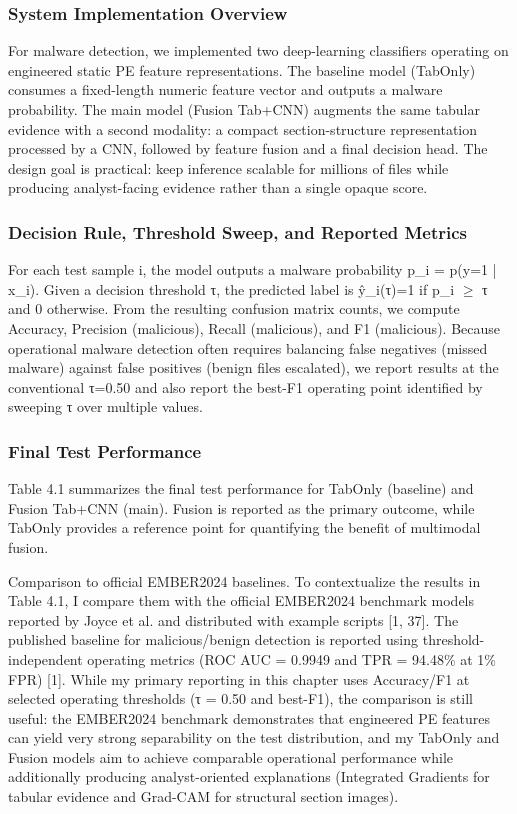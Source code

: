 \documentclass[conference]{IEEEtran}
\begin{document}
\subsubsection{System Implementation Overview}

For malware detection, we implemented two deep-learning classifiers operating on engineered static PE feature representations. The baseline model (TabOnly) consumes a fixed-length numeric feature vector and outputs a malware probability. The main model (Fusion Tab+CNN) augments the same tabular evidence with a second modality: a compact section-structure representation processed by a CNN, followed by feature fusion and a final decision head. The design goal is practical: keep inference scalable for millions of files while producing analyst-facing evidence rather than a single opaque score.

\subsubsection{Decision Rule, Threshold Sweep, and Reported Metrics}

For each test sample i, the model outputs a malware probability p\_i = p(y=1 | x\_i). Given a decision threshold τ, the predicted label is ŷ\_i(τ)=1 if p\_i $\geq$ τ and 0 otherwise. From the resulting confusion matrix counts, we compute Accuracy, Precision (malicious), Recall (malicious), and F1 (malicious). Because operational malware detection often requires balancing false negatives (missed malware) against false positives (benign files escalated), we report results at the conventional τ=0.50 and also report the best-F1 operating point identified by sweeping τ over multiple values.

\subsubsection{Final Test Performance}

Table 4.1 summarizes the final test performance for TabOnly (baseline) and Fusion Tab+CNN (main). Fusion is reported as the primary outcome, while TabOnly provides a reference point for quantifying the benefit of multimodal fusion.

Comparison to official EMBER2024 baselines. To contextualize the results in Table 4.1, I compare them with the official EMBER2024 benchmark models reported by Joyce et al. and distributed with example scripts [1, 37]. The published baseline for malicious/benign detection is reported using threshold-independent operating metrics (ROC AUC = 0.9949 and TPR = 94.48\% at 1\% FPR) [1]. While my primary reporting in this chapter uses Accuracy/F1 at selected operating thresholds (τ = 0.50 and best-F1), the comparison is still useful: the EMBER2024 benchmark demonstrates that engineered PE features can yield very strong separability on the test distribution, and my TabOnly and Fusion models aim to achieve comparable operational performance while additionally producing analyst-oriented explanations (Integrated Gradients for tabular evidence and Grad-CAM for structural section images).
\end{document}
